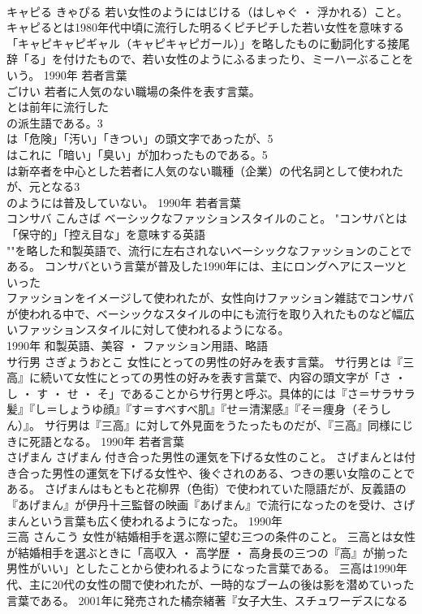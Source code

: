 \documentclass[8pt]{extreport}
\begin{document}
\begin{CJK}{UTF8}{min}
\\	キャピる	きゃぴる	若い女性のようにはじける（はしゃぐ ・ 浮かれる）こと。	キャピるとは1980年代中頃に流行した明るくピチピチした若い女性を意味する「キャピキャピギャル（キャピキャピガール）」を略したものに動詞化する接尾辞「る」を付けたもので、若い女性のようにふるまったり、ミーハーぶることをいう。	1990年	若者言葉	
\\	ごけい	若者に人気のない職場の条件を表す言葉。	
\\	とは前年に流行した
\\	の派生語である。3
\\	は「危険」「汚い」「きつい」の頭文字であったが、5
\\	はこれに「暗い」「臭い」が加わったものである。5
\\	は新卒者を中心とした若者に人気のない職種（企業）の代名詞として使われたが、元となる3
\\	のようには普及していない。	1990年	若者言葉	
\\	コンサバ	こんさば	ベーシックなファッションスタイルのこと。	"コンサバとは「保守的」「控え目な」を意味する英語
\\	""を略した和製英語で、流行に左右されないベーシックなファッションのことである。 コンサバという言葉が普及した1990年には、主にロングヘアにスーツといった
\\	ファッションをイメージして使われたが、女性向けファッション雑誌でコンサバが使われる中で、ベーシックなスタイルの中にも流行を取り入れたものなど幅広いファッションスタイルに対して使われるようになる。
\\	1990年	和製英語、美容 ・ ファッション用語、略語	
\\	サ行男	さぎょうおとこ	女性にとっての男性の好みを表す言葉。	サ行男とは『三高』に続いて女性にとっての男性の好みを表す言葉で、内容の頭文字が「さ ・ し ・ す ・ せ ・ そ」であることからサ行男と呼ぶ。具体的には『さ＝サラサラ髪』『し＝しょうゆ顔』『す＝すべすべ肌』『せ＝清潔感』『そ＝痩身（そうしん）』。 サ行男は『三高』に対して外見面をうたったものだが、『三高』同様にじきに死語となる。	1990年	若者言葉	
\\	さげまん	さげまん	付き合った男性の運気を下げる女性のこと。	さげまんとは付き合った男性の運気を下げる女性や、後ぐされのある、つきの悪い女陰のことである。 さげまんはもともと花柳界（色街）で使われていた隠語だが、反義語の『あげまん』が伊丹十三監督の映画『あげまん』で流行になったのを受け、さげまんという言葉も広く使われるようになった。	1990年	
\\	三高	さんこう	女性が結婚相手を選ぶ際に望む三つの条件のこと。	三高とは女性が結婚相手を選ぶときに「高収入 ・ 高学歴 ・ 高身長の三つの『高』が揃った男性がいい」としたことから使われるようになった言葉である。 三高は1990年代、主に20代の女性の間で使われたが、一時的なブームの後は影を潜めていった言葉である。 2001年に発売された橘奈緒著『女子大生、スチュワーデスになる 

\end{CJK}
\end{document}
